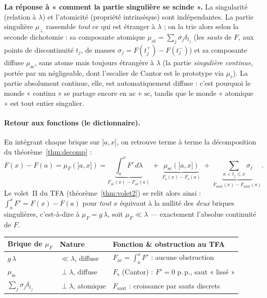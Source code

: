 \documentclass[11pt]{article}
\theoremstyle{thmblue}
\theoremstyle{defplain}
\theoremstyle{rem}
\newcommand{\pp}{p.\,p.}
\begin{document}
\noindent
\textbf{La réponse à « comment la partie singulière se scinde ».} La singularité (relation à $\lambda$)
et l'atomicité (propriété intrinsèque) sont indépendantes. La partie singulière $\mu_\perp$ rassemble
\emph{tout} ce qui est étranger à $\lambda$ ; on la trie alors selon la seconde dichotomie : sa
composante atomique $\mu_{\mathrm{at}}=\sum_j\sigma_j\delta_{t_j}$ (les \emph{sauts} de $F$, aux points
de discontinuité $t_j$, de masses $\sigma_j=F(t_j^+)-F(t_j^-)$) et sa composante diffuse
$\mu_{\mathrm{sc}}$, sans atome mais toujours étrangère à $\lambda$ (la partie \emph{singulière
continue}, portée par un négligeable, dont l'escalier de Cantor est le prototype via $\mu_c$). La
partie absolument continue, elle, est automatiquement diffuse : c'est pourquoi le monde « continu » se
partage encore en $\mathrm{ac}+\mathrm{sc}$, tandis que le monde « atomique » est tout entier singulier.

\paragraph{Retour aux fonctions (le dictionnaire).}
En intégrant chaque brique sur $]a,x]$, on retrouve terme à terme la décomposition du
théorème~\ref{thm:decomp} :
\[
F(x)-F(a)=\mu_F(]a,x])
=\underbrace{\int_a^x F'\,d\lambda}_{F_{\mathrm{ac}}(x)-F_{\mathrm{ac}}(a)}
\;+\;\underbrace{\mu_{\mathrm{sc}}(]a,x])}_{F_{\mathrm{s}}(x)-F_{\mathrm{s}}(a)}
\;+\;\underbrace{\sum_{a<t_j\le x}\sigma_j}_{F_{\mathrm{saut}}(x)-F_{\mathrm{saut}}(a)}.
\]
Le volet~II du TFA (théorème~\ref{thm:volet2}) se relit alors ainsi : $\int_a^x F'=F(x)-F(a)$ pour
\emph{tout} $x$ équivaut à la nullité des \emph{deux} briques singulières, c'est-à-dire à
$\mu_F=g\,\lambda$, soit $\mu_F\ll\lambda$ --- exactement l'absolue continuité de $F$.

\begin{center}
\renewcommand{\arraystretch}{1.35}
\begin{tabular}{@{}>{\raggedright}p{3.5cm} >{\raggedright}p{4.1cm} >{\raggedright\arraybackslash}p{6.4cm}@{}}
\toprule
\textbf{Brique de $\mu_F$} & \textbf{Nature} & \textbf{Fonction \& obstruction au TFA} \\
\midrule
$g\,\lambda$ & $\ll\lambda$, diffuse & $F_{\mathrm{ac}}=\int_a^x F'$ : aucune obstruction \\
$\mu_{\mathrm{sc}}$ & $\perp\lambda$, diffuse & $F_{\mathrm{s}}$ (Cantor) : $F'=0$ \pp, saut « lissé » \\
$\sum_j\sigma_j\delta_{t_j}$ & $\perp\lambda$, atomique & $F_{\mathrm{saut}}$ : croissance par sauts discrets \\
\bottomrule
\end{tabular}
\end{center}
\end{document}
